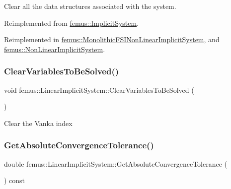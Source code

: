 Clear all the data structures associated with the system. 

Reimplemented from \mbox{\hyperlink{classfemus_1_1_implicit_system_a0d5395e6a8de6625f9059384b990f83f}{femus\+::\+Implicit\+System}}.



Reimplemented in \mbox{\hyperlink{classfemus_1_1_monolithic_f_s_i_non_linear_implicit_system_ac7f2bedf4d1c6b00f5443cb5128a3069}{femus\+::\+Monolithic\+F\+S\+I\+Non\+Linear\+Implicit\+System}}, and \mbox{\hyperlink{classfemus_1_1_non_linear_implicit_system_afc52f569e5be8c3bf593a00c883d7192}{femus\+::\+Non\+Linear\+Implicit\+System}}.

\mbox{\label{classfemus_1_1_linear_implicit_system_a71658025becd1238e92318c950792b4b}} 
\subsubsection{\texorpdfstring{Clear\+Variables\+To\+Be\+Solved()}{ClearVariablesToBeSolved()}}
{\footnotesize\ttfamily void femus\+::\+Linear\+Implicit\+System\+::\+Clear\+Variables\+To\+Be\+Solved (\begin{DoxyParamCaption}{ }\end{DoxyParamCaption})}

Clear the Vanka index \mbox{\label{classfemus_1_1_linear_implicit_system_a018651018c7725c55096f482d5fa38ba}} 
\subsubsection{\texorpdfstring{Get\+Absolute\+Convergence\+Tolerance()}{GetAbsoluteConvergenceTolerance()}}
{\footnotesize\ttfamily double femus\+::\+Linear\+Implicit\+System\+::\+Get\+Absolute\+Convergence\+Tolerance (\begin{DoxyParamCaption}{ }\end{DoxyParamCaption}) const\hspace{0.3cm}{\ttfamily [inline]}}

